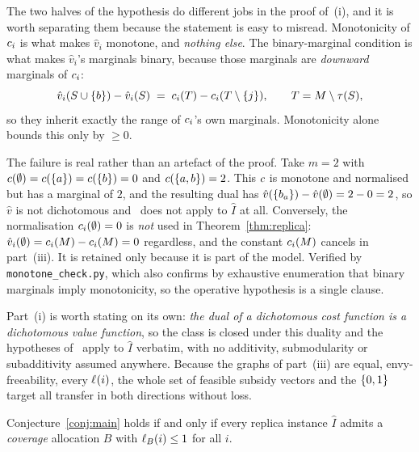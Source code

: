 \begin{remark}
\label{rem:whichclause}
The two halves of the hypothesis do different jobs in the proof of~(i), and it
is worth separating them because the statement is easy to misread.
Monotonicity of $c_i$ is what makes $\hat{v}_i$ monotone, and \emph{nothing
else}. The binary-marginal condition is what makes $\hat{v}_i$'s marginals
binary, because those marginals are \emph{downward} marginals of $c_i$:
\[
  \hat{v}_i(S \cup \left\{b\right\}) - \hat{v}_i(S)
  \;=\; c_i(T) - c_i(T \setminus \left\{j\right\}), \qquad
  T = M \setminus \tau(S),
\]
so they inherit exactly the range of $c_i$'s own marginals. Monotonicity
alone bounds this only by $\ge 0$.

The failure is real rather than an artefact of the proof. Take $m = 2$ with
$c(\emptyset) = c(\left\{a\right\}) = c(\left\{b\right\}) = 0$ and
$c(\left\{a,b\right\}) = 2$. This $c$ is monotone and normalised but has a
marginal of $2$, and the resulting dual has
$\hat{v}(\left\{b_a\right\}) - \hat{v}(\emptyset) = 2 - 0 = 2$, so $\hat{v}$ is not
dichotomous and~\cite{BKNS22} does not apply to $\hat{I}$ at all. Conversely,
the normalisation $c_i(\emptyset) = 0$ is \emph{not} used in
Theorem~\ref{thm:replica}: $\hat{v}_i(\emptyset) = c_i(M) -
c_i(M) = 0$ regardless, and the constant $c_i(M)$ cancels in
part~(iii). It is retained only because it is part of the model. Verified by
\texttt{monotone\_check.py}, which also confirms by exhaustive enumeration that
binary marginals imply monotonicity, so the operative hypothesis is a single
clause.
\end{remark}

Part~(i) is worth stating on its own: \emph{the dual of a dichotomous cost
function is a dichotomous value function}, so the class is closed under this
duality and the hypotheses of~\cite{BKNS22} apply to $\hat{I}$ verbatim, with no
additivity, submodularity or subadditivity assumed anywhere. Because the graphs
of part~(iii) are equal, envy-freeability, every $\ell_{}(i)$, the whole set of
feasible subsidy vectors and the $\left\{0,1\right\}$ target all transfer in both
directions without loss.

\begin{corollary}
\label{cor:coverage}
Conjecture~\ref{conj:main} holds if and only if every replica instance
$\hat{I}$ admits a \emph{coverage} allocation $B$ with
$\ell_{B}(i) \le 1$ for all $i$.
\end{corollary}

